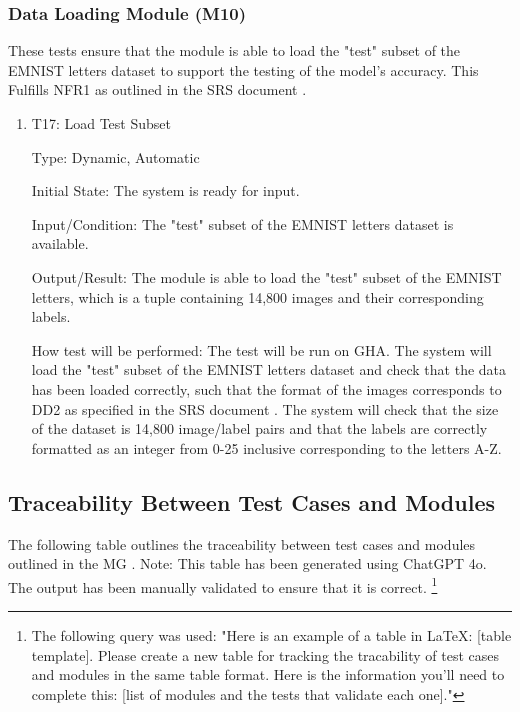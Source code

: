 \documentclass[12pt, titlepage]{article}
\begin{document}

\subsubsection{Data Loading Module (M10)}

These tests ensure that the module is able to load the "test" subset of the
EMNIST letters dataset to support the testing of the model's accuracy. This
Fulfills NFR1 as outlined in the SRS document \citep{SRS}.

\begin{enumerate}

\item{T17: Load Test Subset\\}

Type: Dynamic, Automatic

Initial State: The \progname{} system is ready for input.

Input/Condition: The "test" subset of the EMNIST letters dataset is available.

Output/Result: The module is able to load the "test" subset of the EMNIST
letters, which is a tuple containing 14,800 images and their corresponding
labels.

How test will be performed: The test will be run on GHA. The system will load
the "test" subset of the EMNIST letters dataset and check that the data has been
loaded correctly, such that the format of the images corresponds to DD2 as
specified in the SRS document \citep{SRS}. The system will check that the size
of the dataset is 14,800 image/label pairs and that the labels are correctly
formatted as an integer from 0-25 inclusive corresponding to the letters A-Z.

\end{enumerate}


\subsection{Traceability Between Test Cases and Modules}

The following table outlines the traceability between test cases and modules
outlined in the MG \citep{MG}. Note: This table has been generated using ChatGPT
4o. The output has been manually validated to ensure that it is correct.
\footnote{The following query was used: "Here is an example of a table in LaTeX:
[table template]. Please create a new table for tracking the tracability of test cases and modules in the same table format. Here is the information you'll need to complete this: [list of modules and the tests that validate each one]."}
\end{document}
